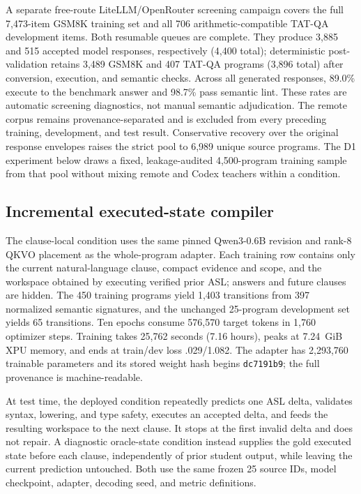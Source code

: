 \documentclass[11pt]{article}
\begin{document}
A separate free-route LiteLLM/OpenRouter screening campaign covers the full
7,473-item GSM8K training set and all 706 arithmetic-compatible TAT-QA
development items. Both resumable queues are complete. They produce 3,885 and
515 accepted model responses, respectively (4,400 total); deterministic
post-validation retains 3,489 GSM8K and 407 TAT-QA programs (3,896 total) after
conversion, execution, and semantic checks. Across all generated responses,
89.0\% execute to the benchmark answer and 98.7\% pass semantic lint. These
rates are automatic screening diagnostics, not manual semantic adjudication.
The remote corpus remains provenance-separated and is excluded from every
preceding training, development, and test result. Conservative recovery over
the original response envelopes raises the strict pool to 6,989 unique source
programs. The D1 experiment below draws a fixed, leakage-audited 4,500-program
training sample from that pool without mixing remote and Codex teachers within
a condition.

\subsection{Incremental executed-state compiler}

The clause-local condition uses the same pinned Qwen3-0.6B revision and rank-8
QKVO placement as the whole-program adapter. Each training row contains only the
current natural-language clause, compact evidence and scope, and the workspace
obtained by executing verified prior ASL; answers and future clauses are hidden.
The 450 training programs yield 1,403 transitions from 397 normalized semantic
signatures, and the unchanged 25-program development set yields 65 transitions.
Ten epochs consume 576,570 target tokens in 1,760 optimizer steps. Training takes
25,762 seconds (7.16 hours), peaks at 7.24~GiB XPU memory, and ends at train/dev
loss .029/1.082. The adapter has 2,293,760 trainable parameters and its stored
weight hash begins \texttt{dc7191b9}; the full provenance is machine-readable.

At test time, the deployed condition repeatedly predicts one ASL delta, validates
syntax, lowering, and type safety, executes an accepted delta, and feeds the
resulting workspace to the next clause. It stops at the first invalid delta and
does not repair. A diagnostic oracle-state condition instead supplies the gold
executed state before each clause, independently of prior student output, while
leaving the current prediction untouched. Both use the same frozen 25 source IDs,
model checkpoint, adapter, decoding seed, and metric definitions.
\end{document}

